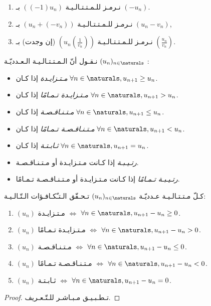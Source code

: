 \begin{remark}
    \begin{enumerate}
        \item نـرمـز للـمـتـتـالـيـة \(\left((-1)u_n\right)\) بـ \((-u_n)\).
        \item نـرمـز للـمـتـتـالـيـة \((u_n + (-v_n))\) بـ \((u_n - v_n)\),
        \item نـرمـز للـمـتـتـالـيـة \(\left(u_n\left(\frac{1}{v_n}\right)\right)\) (إن وجدت)
              بـ \(\left(\frac{u_n}{v_n}\right)\).
    \end{enumerate}
\end{remark}

\begin{definition}%
    \label{def:sequences:monotony-and-variations}
    نـقـول أنّ الـمـتـتـالـيـة الـعـدديّـة \((u_n)_{n \in \naturals}\) :
    \begin{itemize}
        \item \emph{مـتـزايـدة} إذا كـان \(\forall n \in \naturals, u_{n+1} \ge u_n\).
        \item \emph{مـتـزايـدة تـمـامًا} إذا كـان \(\forall n \in \naturals, u_{n+1} > u_n\).
        \item \emph{مـتـنـاقـصـة} إذا كـان \(\forall n \in \naturals, u_{n+1} \le u_n\).
        \item \emph{مـتـنـاقـصـة تـمـامًا} إذا كـان \(\forall n \in \naturals, u_{n+1} < u_n\).
        \item \emph{ثـابـتـة} إذا كـان \(\forall n \in \naturals, u_{n+1} = u_n\).
        \item \emph{رتـيـبـة} إذا كـانت مـتـزايـدة أو مـتـنـاقـصـة.
        \item \emph{رتـيـبـة تـمـامًا} إذا كـانت مـتـزايـدة أو مـتـنـاقـصـة تـمـامًا.
    \end{itemize}
\end{definition}

\begin{theorem}%
    \label{thm:sequences:variations}
    كـلّ مـتـتـالـيـة عـدديّـة \((u_n)_{n \in \naturals}\) تـحـقّق الـتـّكـافـؤات الـتّـالـيـة:
    \begin{enumerate}
        \item \((u_n)\) مـتـزايـدة  \(\iff\) \(\forall n \in \naturals, u_{n+1} - u_n \ge 0 \).
        \item \((u_n)\) مـتـزايـدة تـمـامًا \(\iff\) \(\forall n \in \naturals, u_{n+1} - u_n > 0 \).
        \item \((u_n)\) مـتـنـاقـصـة \(\iff\) \(\forall n \in \naturals, u_{n+1} - u_n \le 0 \).
        \item \((u_n)\) مـتـنـاقـصـة تـمـامًا \(\iff\) \(\forall n \in \naturals, u_{n+1} - u_n < 0 \).
        \item \((u_n)\) ثـابـتـة \(\iff\) \(\forall n \in \naturals, u_{n+1} - u_n = 0 \).
    \end{enumerate}
\end{theorem}
\begin{proof}%
    تـطـبـيـق مـبـاشـر للـتّـعـريف.
\end{proof}

\begin{exercise}

\end{exercise}

\begin{sproblem}

\end{sproblem}